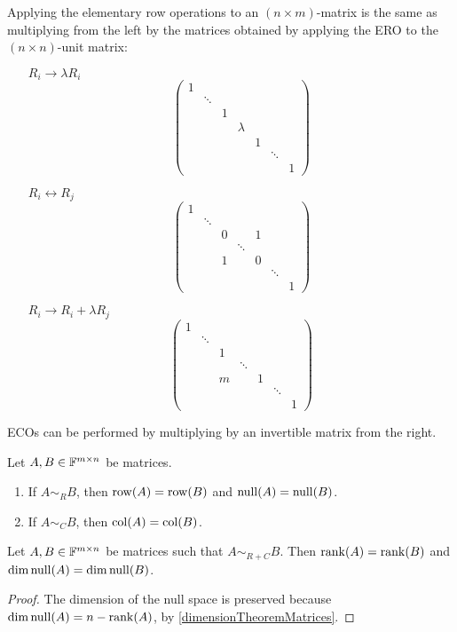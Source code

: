 \begin{lemma} \label{matricesEROs}
Applying the elementary row operations to an $(n\times m)$-matrix is the same as multiplying from the left by the matrices obtained by applying the ERO to the $(n\times n)$-unit matrix:
\begin{itemize}[leftmargin=3cm]
\item[$\boxed{R_i \to \lambda R_i}$]
\[ \begin{pmatrix}
1 &&&&&& \\
 & \ddots &&&&& \\ 
  & & 1 &&&& \\
 & &  & \lambda &&& \\
 & &  & & 1 && \\
 &&&&& \ddots & \\
 &&&&&& 1
\end{pmatrix} \]
\item[$\boxed{R_i \leftrightarrow R_j}$]
\[ \begin{pmatrix}1&&&&&&\\&\ddots &&&&&\\&&0&&1&&\\&&&\ddots &&&\\&&1&&0&&\\&&&&&\ddots &\\&&&&&&1\end{pmatrix} \]
\item[$\boxed{R_i \to R_i+ \lambda R_j}$]
\[ \begin{pmatrix}1&&&&&&\\&\ddots &&&&&\\&&1&&&&\\&&&\ddots &&&\\&&m&&1&&\\&&&&&\ddots &\\&&&&&&1\end{pmatrix} \]
\end{itemize}
\end{lemma}
\begin{corollary}
ECOs can be performed by multiplying by an invertible matrix from the right.
\end{corollary}
\begin{corollary}
Let $A,B\in\mathbb{F}^{m\times n}$ be matrices.
\begin{enumerate}
\item If $A\sim_R B$, then $\operatorname{row}(A) = \operatorname{row}(B)$ and $\operatorname{null}(A) = \operatorname{null}(B)$.
\item If $A\sim_C B$, then $\operatorname{col}(A) = \operatorname{col}(B)$.
\end{enumerate}
\end{corollary}
\begin{corollary}
Let $A,B\in\mathbb{F}^{m\times n}$ be matrices such that $A\sim_{R+C} B$. Then $\operatorname{rank}(A) = \operatorname{rank}(B)$ and $\dim\operatorname{null}(A) = \dim\operatorname{null}(B)$.
\end{corollary}
\begin{proof}
The dimension of the null space is preserved because $\dim\operatorname{null}(A) = n - \operatorname{rank}(A)$, by \ref{dimensionTheoremMatrices}.
\end{proof}

